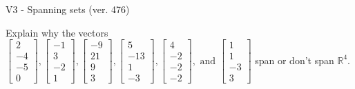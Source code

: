 \begin{exercise}
  \begin{exerciseTitle}V3 - Spanning sets (ver. 476)\end{exerciseTitle}
  \begin{exerciseStatement}
    Explain why the vectors \(\left[\begin{array}{r}
2 \\
-4 \\
-5 \\
0
\end{array}\right] , \left[\begin{array}{r}
-1 \\
3 \\
-2 \\
1
\end{array}\right] , \left[\begin{array}{r}
-9 \\
21 \\
9 \\
3
\end{array}\right] , \left[\begin{array}{r}
5 \\
-13 \\
1 \\
-3
\end{array}\right] , \left[\begin{array}{r}
4 \\
-2 \\
-2 \\
-2
\end{array}\right] , \text{ and } \left[\begin{array}{r}
1 \\
1 \\
-3 \\
3
\end{array}\right]\) span or don't span \(\mathbb{R}^4\). 
	



\end{exerciseStatement}
\end{exercise}
